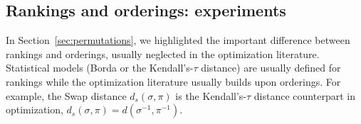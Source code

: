 \documentclass[sigconf,dvipsnames]{acmart}
\newcommand{\supplement}{\href{http://doi.org/10.5281/zenodo.4500974}{doi:~10.5281/zenodo.4500974}}
\newcommand{\ken}{Kendall's-$\tau$\xspace}
\begin{document}

\newcommand{\CEGOorig}{CEGO$_\textsc{ori}$\xspace}
\newcommand{\CEGOinv}{CEGO$_\textsc{inv}$\xspace}

\subsection{Rankings and orderings: experiments}\label{sec:exper_ro}


In Section~\ref{sec:permutations}, we highlighted the important difference between rankings and orderings, usually neglected in the optimization literature. Statistical models (Borda or the \ken distance) are usually defined for rankings while the optimization literature usually builds upon orderings. For example, the Swap distance $d_s(\sigma,\pi)$ is the \ken distance counterpart in optimization, $d_s(\sigma,\pi) = d(\sigma^{-1}, \pi^{-1})$. %
\end{document}
